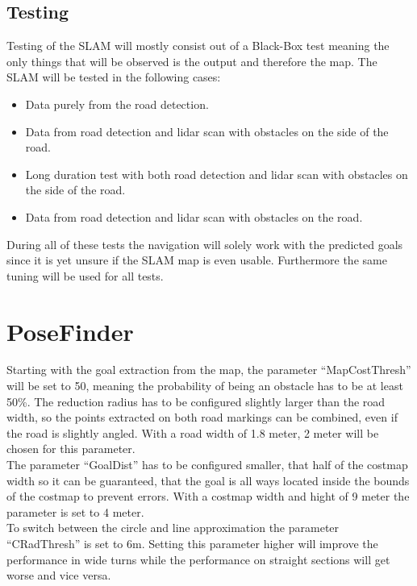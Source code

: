 \subsection{Testing}
Testing of the SLAM will mostly consist out of a Black-Box test meaning the only things that will be observed is the output and therefore the map.
The SLAM will be tested in the following cases:
\begin{itemize}
	\item Data purely from the road detection.
	\item Data from road detection and lidar scan with obstacles on the side of the road.
	\item Long duration test with both road detection and lidar scan with obstacles on the side of the road.
	\item Data from road detection and lidar scan with obstacles on the road.
\end{itemize}

During all of these tests the navigation will solely work with the predicted goals since it is yet unsure if the SLAM map is even usable. Furthermore the same tuning will be used for all tests.\\



\section{PoseFinder}

Starting with the goal extraction from the map, the parameter ``MapCostThresh'' will be set to 50, meaning the probability of being an obstacle has to be at least 50\%. The reduction radius has to be configured slightly larger than the road width, so the points extracted on both road markings can be combined, even if the road is slightly angled. With a road width of 1.8 meter, 2 meter will be chosen for this parameter.\\

The parameter ``GoalDist'' has to be configured smaller, that half of the costmap width so it can be guaranteed, that the goal is all ways located inside the bounds of the costmap to prevent errors. With a costmap width and hight of 9 meter the parameter is set to 4 meter.\\

To switch between the circle and line approximation the parameter ``CRadThresh'' is set to 6m. Setting this parameter higher will improve the performance in wide turns while the performance on straight sections will get worse and vice versa.\\

